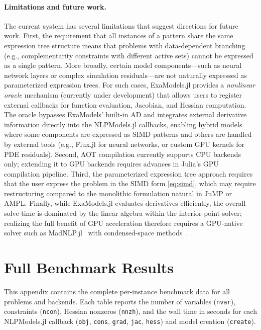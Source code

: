\documentclass[11pt]{article}
\begin{document}
\paragraph{Limitations and future work.}
The current system has several limitations that suggest directions for future work. First, the requirement that all instances of a pattern share the same expression tree structure means that problems with data-dependent branching (e.g., complementarity constraints with different active sets) cannot be expressed as a single pattern. More broadly, certain model components---such as neural network layers or complex simulation residuals---are not naturally expressed as parameterized expression trees. For such cases, ExaModels.jl provides a \emph{nonlinear oracle} mechanism (currently under development) that allows users to register external callbacks for function evaluation, Jacobian, and Hessian computation. The oracle bypasses ExaModels' built-in AD and integrates external derivative information directly into the NLPModels.jl callbacks, enabling hybrid models where some components are expressed as SIMD patterns and others are handled by external tools (e.g., Flux.jl for neural networks, or custom GPU kernels for PDE residuals). Second, AOT compilation currently supports CPU backends only; extending it to GPU backends requires advances in Julia's GPU compilation pipeline. Third, the parameterized expression tree approach requires that the user express the problem in the SIMD form \cref{eq:simd}, which may require restructuring compared to the monolithic formulation natural in JuMP or AMPL. Finally, while ExaModels.jl evaluates derivatives efficiently, the overall solve time is dominated by the linear algebra within the interior-point solver; realizing the full benefit of GPU acceleration therefore requires a GPU-native solver such as MadNLP.jl~\citep{shinMadNLPjl2025} with condensed-space methods~\citep{pacaudCondensedspaceMethodsNonlinear2024}.


\printbibliography

\appendix

\section{Full Benchmark Results}
\label{app:tables}

This appendix contains the complete per-instance benchmark data for all problems and backends. Each table reports the number of variables (\texttt{nvar}), constraints (\texttt{ncon}), Hessian nonzeros (\texttt{nnzh}), and the wall time in seconds for each NLPModels.jl callback (\texttt{obj}, \texttt{cons}, \texttt{grad}, \texttt{jac}, \texttt{hess}) and model creation (\texttt{create}).
\end{document}
